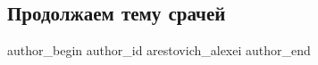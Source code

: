  
 
 
 
 

\subsection{Продолжаем тему срачей}
\label{sec:13_01_2023.fb.arestovich_alexei.1.prodolzhaem_temu_sra}

\ifcmt
 author_begin
   author_id arestovich_alexei
 author_end
\fi
